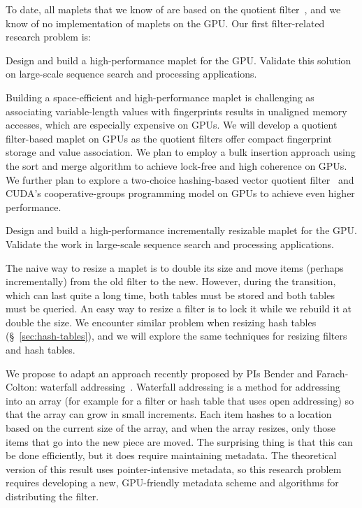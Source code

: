 To date, all maplets that we know of are based on the quotient filter~\cite{conway2020splinterdb,PandeyBJP17,DBLP:journals/pacmmod/ConwayFJ23}, and we know of no implementation of maplets on the GPU\@.
Our first filter-related research problem is:

\begin{rproblem}
Design and build a high-performance maplet for the GPU\@. Validate this solution on large-scale sequence search and \kmer processing applications.
\end{rproblem}

Building a space-efficient and high-performance maplet is challenging as associating variable-length values with fingerprints results in unaligned memory accesses, which are especially expensive on GPUs. We will develop a quotient filter-based maplet on GPUs as the quotient filters offer compact fingerprint storage and value association. We plan to employ a bulk insertion approach using the sort and merge algorithm to achieve lock-free and high coherence on GPUs. We further plan to explore a two-choice hashing-based vector quotient filter~\cite{PandeyCDBFJ21} and CUDA's cooperative-groups programming model on GPUs to achieve even higher performance.

\begin{rproblem}\label{rprob:resizable-maplet}
Design and build a high-performance incrementally resizable maplet for the GPU\@. Validate the work in large-scale sequence search and \kmer processing applications.
\end{rproblem}

The naive way to resize a maplet is to double its size and move items (perhaps incrementally) from the old filter to the new.  However, during the transition, which can last quite a long time, both tables must be stored and both tables must be queried. An easy way to resize a filter is to lock it while we rebuild it at double the size.  We encounter similar problem when resizing hash tables (\S~\ref{sec:hash-tables}), and we will explore the same techniques for resizing filters and hash tables.

We propose to adapt an approach recently proposed by PIs Bender and Farach-Colton: waterfall addressing~\cite{BenderFaKu22b}.   Waterfall addressing is a method for addressing into an array (for example for a filter or hash table that uses open addressing) so that the array can grow in small increments.  Each item hashes to a location based on the current size of the array, and when the array resizes, only those items that go into the new piece are moved.  The surprising thing is that this can be done efficiently, but it does require maintaining metadata.  The theoretical version of this result uses pointer-intensive metadata, so this research problem requires developing a new, GPU-friendly metadata scheme and algorithms for distributing the filter. 

